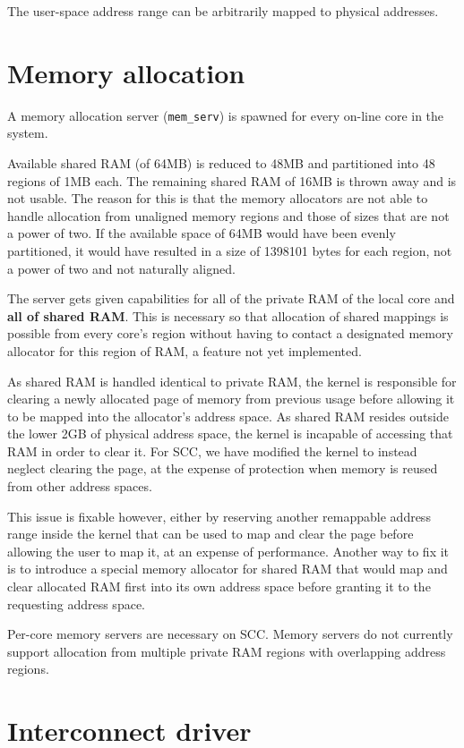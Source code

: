 \documentclass[a4paper,twoside]{report} %
\begin{document}
The user-space address range can be arbitrarily mapped to physical
addresses.

\section{Memory allocation}

A memory allocation server (\texttt{mem\_serv}) is spawned for every
on-line core in the system.

Available shared RAM (of 64MB) is reduced to 48MB and partitioned into
48 regions of 1MB each. The remaining shared RAM of 16MB is thrown
away and is not usable. The reason for this is that the memory
allocators are not able to handle allocation from unaligned memory
regions and those of sizes that are not a power of two. If the
available space of 64MB would have been evenly partitioned, it would
have resulted in a size of 1398101 bytes for each region, not a power
of two and not naturally aligned.

The server gets given capabilities for all of the private RAM of the
local core and \textbf{all of shared RAM}. This is necessary so that
allocation of shared mappings is possible from every core's region
without having to contact a designated memory allocator for this
region of RAM, a feature not yet implemented.

As shared RAM is handled identical to private RAM, the kernel is
responsible for clearing a newly allocated page of memory from
previous usage before allowing it to be mapped into the allocator's
address space. As shared RAM resides outside the lower 2GB of physical
address space, the kernel is incapable of accessing that RAM in order
to clear it. For SCC, we have modified the kernel to instead neglect
clearing the page, at the expense of protection when memory is reused
from other address spaces.

This issue is fixable however, either by reserving another remappable
address range inside the kernel that can be used to map and clear the
page before allowing the user to map it, at an expense of
performance. Another way to fix it is to introduce a special memory
allocator for shared RAM that would map and clear allocated RAM first
into its own address space before granting it to the requesting
address space.

Per-core memory servers are necessary on SCC. Memory servers do not
currently support allocation from multiple private RAM regions with
overlapping address regions.

\section{Interconnect driver}\label{sec:interconnect}
\end{document}
